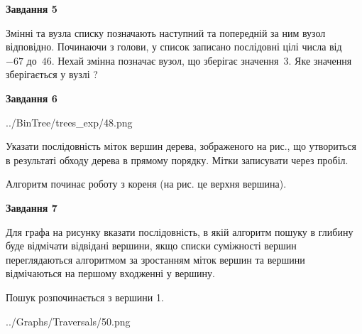 \documentclass[12pt, ukrainian]{article}
\begin{document}
{\begin {large}
{\begin {center}\textbf{Завдання 5}\end {center}}\par
Змінні  та  вузла списку позначають наступний та попередній за ним вузол відповідно. Починаючи з голови, у список записано послідовні цілі числа від~$-67$ до~$46$. Нехай змінна  позначає вузол, що зберігає значення~$3$.
Яке значення зберігається у вузлі  ?\par
\newpage

{\begin {center}\textbf{Завдання 6}\end {center}}\par

\begin{center}
	{../BinTree/trees_exp/48.png}
\end{center}
Указати послідовність міток вершин дерева, зображеного на рис., що утвориться в результаті обходу дерева в прямому порядку. Мітки записувати через пробіл.\par Алгоритм починає роботу з кореня (на рис. це верхня вершина).\par
\newpage

{\begin {center}\textbf{Завдання 7}\end {center}}\par
Для графа на рисунку вказати послідовність, в якій алгоритм пошуку в глибину буде відмічати відвідані вершини, якщо списки суміжності вершин переглядаються алгоритмом за зростанням міток вершин та вершини відмічаються на першому вход\-женні у вершину.\par
Пошук розпочинається з вершини 1.\par

\begin{center}
	{../Graphs/Traversals/50.png}
\end{center}\par
\newpage


\end{large}}
\end{document}
